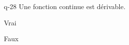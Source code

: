 \begin{truefalse}{q-28}
Une fonction continue est dérivable.
\item Vrai
\item* Faux
\end{truefalse}

